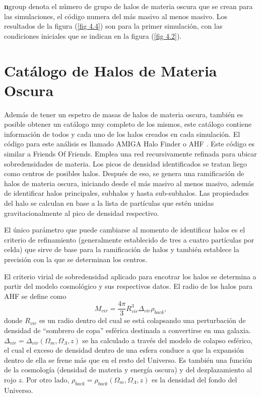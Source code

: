\documentclass[a4paper,openright,12pt]{book}
\begin{document}
\textbf{n}group denota el número de grupo de halos de materia oscura que se crean para las simulaciones, el código numera del más masivo al menos masivo. Los resultados de la figura (\ref{fig 4.4}) son para la primer simulación, con las condiciones iniciales que se indican en la figura (\ref{fig 4.2}). 

\section{Catálogo de Halos de Materia Oscura}
Además de tener un espetro de masas de halos de materia oscura, también es posible obtener un catálogo muy completo de los mismos, este catálogo contiene información de todos y cada uno de los halos creados en cada simulación. El código para este análisis es llamado AMIGA Halo Finder o AHF \cite{4.5}. Este código es similar a Friends Of Friends. Emplea una red recursivamente refinada para ubicar sobredensidades de materia. Los picos de densidad identificados se tratan liego como centros de posibles halos. Después de eso, se genera una ramificación de halos de materia oscura, iniciando desde el más masivo al menos masivo, además de identificar halos principales, subhalos  y hasta sub-subhalos. Las propiedades del halo se calculan en base a la lista de partículas que estén unidas gravitacionalmente al pico de densidad respectivo. 

El único parámetro que puede cambiarse al momento de identificar halos es el criterio de refinamiento (generalmente establecido de tres a cuatro partículas por celda) que sirve de base para la ramificación de halos y también establece la precisión con la que se determinan los centros. 

El criterio virial de sobredensidad aplicado para encotrar los halos se determina a partir del modelo cosmológico y sus respectivos datos. El radio de los halos para AHF se define como 
\begin{equation}
M_{vir} = \frac{4 \pi}{3}R_{vir}^{3}\Delta_{vir}\rho_{back},\label{eqn 4.1}
\end{equation}
donde $R_{vir}$ es un radio dentro del cual se está colapsando una perturbación de densidad de ``sombrero de copa'' esférica destinada a convertirse en una galaxia. $\Delta_{vir}=\Delta_{vir}(\Omega_{m},\Omega_{\Lambda},z)$ se ha calculado a través del modelo de colapso esférico, el cual el exceso de densidad dentro de una esfera conduce a que la expansión dentro de ella se frene más que en el resto del Universo. Es también una función de la cosmología (densidad de materia y energía oscura) y del dezplazamiento al rojo $z$. Por otro lado,  $\rho_{back}=\rho_{back}(\Omega_{m},\Omega_{\Lambda},z)$ es la densidad del fondo del Universo.
\end{document}
